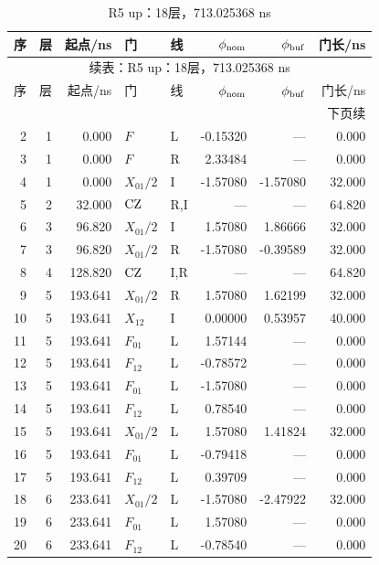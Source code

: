 {\small\setlength{\tabcolsep}{4pt}\fontsize{9}{10.6}\selectfont\renewcommand{\arraystretch}{1.0}
\begin{longtable}{@{}rrrllrrr@{}}
\caption{R5 up：18层，713.025368 ns}\label{tab:r5up}\\\toprule
序 & 层 & 起点/ns & 门 & 线 & $\phi_{\rm nom}$ & $\phi_{\rm buf}$ & 门长/ns\\\midrule\endfirsthead
\multicolumn{8}{c}{续表：R5 up：18层，713.025368 ns}\\\toprule
序 & 层 & 起点/ns & 门 & 线 & $\phi_{\rm nom}$ & $\phi_{\rm buf}$ & 门长/ns\\\midrule\endhead
\midrule\multicolumn{8}{r}{下页续}\endfoot
\bottomrule\endlastfoot
1 & 1 & 0.000 & $F$ & C & 2.15916 & --- & 0.000\\
2 & 1 & 0.000 & $F$ & L & -0.15320 & --- & 0.000\\
3 & 1 & 0.000 & $F$ & R & 2.33484 & --- & 0.000\\
4 & 1 & 0.000 & $X_{01}/2$ & I & -1.57080 & -1.57080 & 32.000\\
5 & 2 & 32.000 & $\mathrm{CZ}$ & R,I & --- & --- & 64.820\\
6 & 3 & 96.820 & $X_{01}/2$ & I & 1.57080 & 1.86666 & 32.000\\
7 & 3 & 96.820 & $X_{01}/2$ & R & -1.57080 & -0.39589 & 32.000\\
8 & 4 & 128.820 & $\mathrm{CZ}$ & I,R & --- & --- & 64.820\\
9 & 5 & 193.641 & $X_{01}/2$ & R & 1.57080 & 1.62199 & 32.000\\
10 & 5 & 193.641 & $X_{12}$ & I & 0.00000 & 0.53957 & 40.000\\
11 & 5 & 193.641 & $F_{01}$ & L & 1.57144 & --- & 0.000\\
12 & 5 & 193.641 & $F_{12}$ & L & -0.78572 & --- & 0.000\\
13 & 5 & 193.641 & $F_{01}$ & L & -1.57080 & --- & 0.000\\
14 & 5 & 193.641 & $F_{12}$ & L & 0.78540 & --- & 0.000\\
15 & 5 & 193.641 & $X_{01}/2$ & L & 1.57080 & 1.41824 & 32.000\\
16 & 5 & 193.641 & $F_{01}$ & L & -0.79418 & --- & 0.000\\
17 & 5 & 193.641 & $F_{12}$ & L & 0.39709 & --- & 0.000\\
18 & 6 & 233.641 & $X_{01}/2$ & L & -1.57080 & -2.47922 & 32.000\\
19 & 6 & 233.641 & $F_{01}$ & L & 1.57080 & --- & 0.000\\
20 & 6 & 233.641 & $F_{12}$ & L & -0.78540 & --- & 0.000\\

\end{longtable}}
